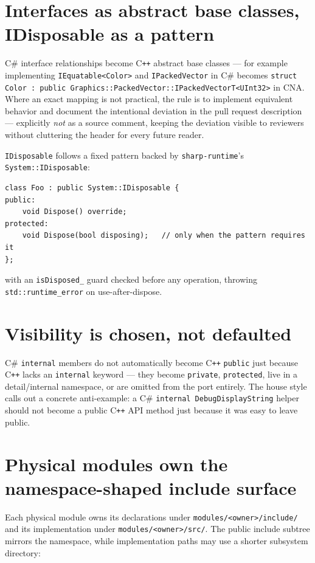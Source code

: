 \section{Interfaces as abstract base classes, IDisposable as a pattern}

C\# interface relationships become C\texttt{++} abstract base classes --- for example
 implementing \texttt{IEquatable<Color>} and \texttt{IPackedVector} in C\#
becomes \texttt{struct Color : public Graphics::PackedVector::IPackedVectorT<UInt32>} in
CNA. Where an exact mapping is not practical, the rule is to implement equivalent behavior
and document the intentional deviation in the pull request description --- explicitly
\emph{not} as a source comment, keeping the deviation visible to reviewers without cluttering
the header for every future reader.

\texttt{IDisposable} follows a fixed pattern backed by \texttt{sharp-runtime}'s
\texttt{System::IDisposable}:

\begin{lstlisting}
class Foo : public System::IDisposable {
public:
    void Dispose() override;
protected:
    void Dispose(bool disposing);   // only when the pattern requires it
};
\end{lstlisting}

with an \texttt{isDisposed\_} guard checked before any operation, throwing
\texttt{std::runtime\_error} on use-after-dispose.

\section{Visibility is chosen, not defaulted}

C\# \texttt{internal} members do not automatically become C\texttt{++} \texttt{public} just
because C\texttt{++} lacks an \texttt{internal} keyword --- they become \texttt{private},
\texttt{protected}, live in a detail/internal namespace, or are omitted from the port
entirely. The house style calls out a concrete anti-example: a C\# \texttt{internal
DebugDisplayString} helper should not become a public C\texttt{++} API method just because it
was easy to leave public.

\section{Physical modules own the namespace-shaped include surface}

Each physical module owns its declarations under \texttt{modules/<owner>/include/} and its
implementation under \texttt{modules/<owner>/src/}. The public include subtree mirrors the
namespace, while implementation paths may use a shorter subsystem directory:

